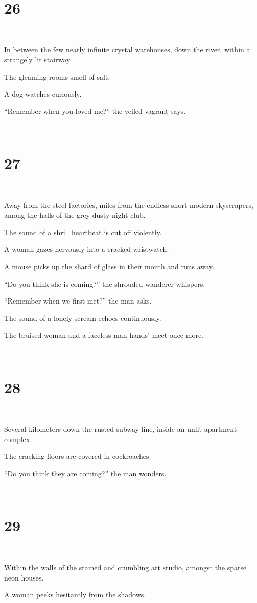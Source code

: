 \documentclass{report}
\begin{document}
~
\chapter*{26}
~

In between the few nearly infinite crystal warehouses, down the river, within a strangely lit stairway.

The gleaming rooms smell of salt.

A dog watches curiously.

``Remember when you loved me?'' the veiled vagrant says.

~
\chapter*{27}
~

Away from the steel factories, miles from the endless short modern skyscrapers, among the halls of the grey dusty night club.

The sound of a shrill heartbeat is cut off violently.

A woman gazes nervously into a cracked wristwatch.

A mouse picks up the shard of glass in their mouth and runs away.

``Do you think she is coming?'' the shrouded wanderer whispers.

``Remember when we first met?'' the man asks.

The sound of a lonely scream echoes continuously.

The bruised woman and a faceless man hands' meet once more.

~
\chapter*{28}
~

Several kilometers down the rusted subway line, inside an unlit apartment complex.

The cracking floors are covered in cockroaches.

``Do you think they are coming?'' the man wonders.

~
\chapter*{29}
~

Within the walls of the stained and crumbling art studio, amongst the sparse neon houses.

A woman peeks hesitantly from the shadows.
\end{document}
